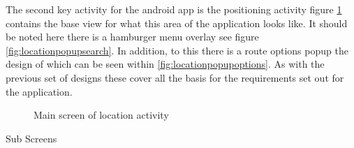 The second key activity for the android app is the positioning activity figure \ref{fig:locationactivity} contains the base view for what this area of the application looks like. It should be noted here there is a hamburger menu overlay see figure \ref{fig:locationpopupsearch}. In addition, to this there is a route options popup the design of which can be seen within \ref{fig:locationpopupoptions}. As with the previous set of designs these cover all the basis for the requirements set out for the application.
\begin{figure}[h]
	\centering
	\caption{Main screen of location activity}
	\label{fig:locationactivity}
\end{figure}
Sub Screens\\

